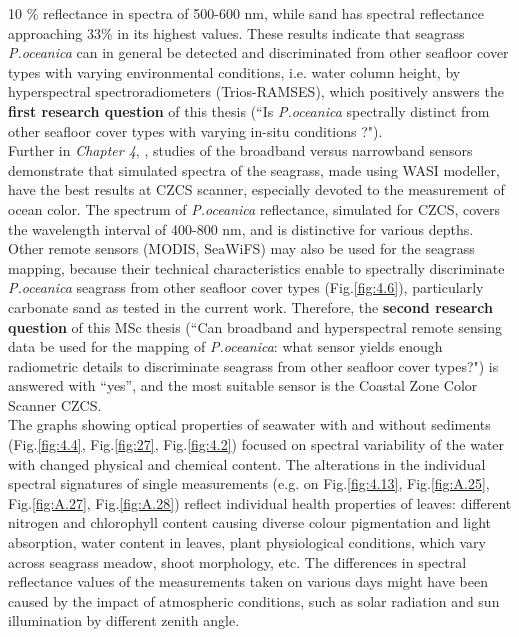 \documentclass[11pt]{article}
\begin{document}
10 \% reflectance in spectra of 500-600 nm, while sand has spectral reflectance approaching 33\% in its highest values. These results indicate that seagrass \textit{P.oceanica} can in general be detected and discriminated from other seafloor cover types with varying environmental conditions, i.e. water column height, by hyperspectral spectroradiometers (\ac{Trios-RAMSES}), which positively answers the \textbf{first research question} of this thesis (``Is \textit{P.oceanica} spectrally distinct from other seafloor cover types with varying in-situ conditions ?"). \vspace{1ex}\\
Further in \textit{Chapter 4}, , studies of the broadband versus narrowband sensors demonstrate that simulated spectra of the seagrass, made using \ac{WASI} modeller, have the best results at \ac{CZCS} scanner, especially devoted to the measurement of ocean color. The spectrum of \textit{P.oceanica} reflectance, simulated for \ac{CZCS}, covers the wavelength interval of 400-800 nm, and is distinctive for various depths. Other remote sensors (\ac{MODIS}, \ac{SeaWiFS}) may also be used for the seagrass mapping, because their technical characteristics enable to spectrally discriminate \textit{P.oceanica} seagrass from other seafloor cover types (Fig.\ref{fig:4.6}), particularly carbonate sand as tested in the current work. Therefore, the \textbf{second research question} of this MSc thesis (``Can broadband and hyperspectral remote sensing data be used for the mapping of \textit{P.oceanica}: what sensor yields enough radiometric details to discriminate seagrass from other seafloor cover types?") is answered with ``yes'', and the most suitable sensor is the Coastal Zone Color Scanner \ac{CZCS}.\vspace{1ex}\\
The graphs showing optical properties of seawater with and without sediments (Fig.\ref{fig:4.4}, Fig.\ref{fig:27}, Fig.\ref{fig:4.2}) focused on spectral variability of the water with changed physical and chemical content. The alterations in the individual spectral signatures of single measurements (e.g. on Fig.\ref{fig:4.13}, Fig.\ref{fig:A.25}, Fig.\ref{fig:A.27}, Fig.\ref{fig:A.28}) reflect individual health properties of leaves: different nitrogen and chlorophyll content causing diverse colour pigmentation and light absorption, water content in leaves, plant physiological conditions, which vary across seagrass meadow, shoot morphology, etc. The differences in spectral reflectance values of the measurements taken on various days might have been caused by the impact of atmospheric conditions, such as solar radiation and sun illumination by different zenith angle.\vspace{1ex}\\
\end{document}

